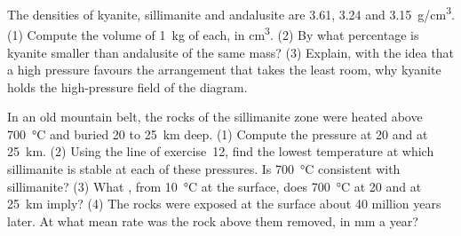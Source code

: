 \begin{exercise}[$\star\star\star$]\label{exo:g12:metamorphic-rocks:14}
The densities of kyanite, sillimanite and andalusite are \num{3.61},
\num{3.24} and \qty{3.15}{g/cm^3}. (1) Compute the volume of \qty{1}{kg} of
each, in \unit{cm^3}. (2) By what percentage is kyanite smaller than
andalusite of the same mass? (3) Explain, with the idea that a high pressure
favours the arrangement that takes the least room, why kyanite holds the
high-pressure field of the diagram.
\end{exercise}

\begin{exercise}[$\star\star\star$]\label{exo:g12:metamorphic-rocks:15}
In an old mountain belt, the rocks of the sillimanite zone were heated above
\qty{700}{\celsius} and buried 20 to \qty{25}{km} deep. (1) Compute the
pressure at 20 and at \qty{25}{km}. (2) Using the line of
exercise~12, find the lowest temperature at which sillimanite is stable at
each of these pressures. Is \qty{700}{\celsius} consistent with sillimanite?
(3) What , from \qty{10}{\celsius} at the surface, does
\qty{700}{\celsius} at 20 and at \qty{25}{km} imply? (4) The rocks were
exposed at the surface about 40 million years later. At what mean rate was
the rock above them removed, in \unit{mm} a year?
\end{exercise}

